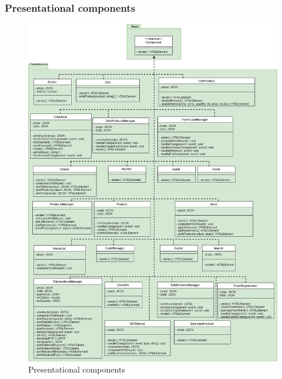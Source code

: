 \subsubsection{Presentational components}
\begin{figure}[H]
	\centering\includegraphics[scale = 0.36]{res/images/Presentational.png}
	\caption{Presentational components}
\end{figure}

